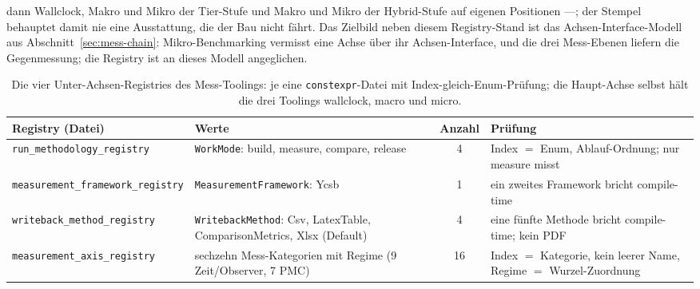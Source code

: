 \begin{nurlang}
dann Wallclock, Makro und Mikro der Tier-Stufe und Makro und Mikro der Hybrid-Stufe auf eigenen
Positionen ---; der Stempel behauptet damit nie eine Ausstattung, die der Bau nicht fährt. Das Zielbild
neben diesem Registry-Stand ist das Achsen-Interface-Modell aus Abschnitt~\ref{sec:mess-chain}:
Mikro-Benchmarking vermisst eine Achse über ihr Achsen-Interface, und die drei Mess-Ebenen liefern die
Gegenmessung; die Registry ist an dieses Modell angeglichen.
\begin{table}[htbp]\centering\footnotesize
\begin{tabular}{@{}p{3.0cm}p{4.6cm}cp{4.0cm}@{}}
\toprule
Registry (Datei) & Werte & Anzahl & Prüfung \\
\midrule
\texttt{run\_\allowbreak{}methodology\_\allowbreak{}registry} & \texttt{WorkMode}: build, measure, compare, release & 4 & Index $=$ Enum, Ablauf-Ordnung; nur measure misst \\
\texttt{measurement\_\allowbreak{}framework\_\allowbreak{}registry} & \texttt{MeasurementFramework}: Ycsb & 1 & ein zweites Framework bricht compile-time \\
\texttt{writeback\_\allowbreak{}method\_\allowbreak{}registry} & \texttt{WritebackMethod}: Csv, LatexTable, ComparisonMetrics, Xlsx (Default) & 4 & eine fünfte Methode bricht compile-time; kein PDF \\
\texttt{measurement\_\allowbreak{}axis\_\allowbreak{}registry} & sechzehn Mess-Kategorien mit Regime (9 Zeit/Observer, 7 PMC) & 16 & Index $=$ Kategorie, kein leerer Name, Regime $=$ Wurzel-Zuordnung \\
\bottomrule
\end{tabular}
\caption{Die vier Unter-Achsen-Registries des Mess-Toolings: je eine \texttt{constexpr}-Datei mit
Index-gleich-Enum-Prüfung; die Haupt-Achse selbst hält die drei Toolings wallclock, macro und
micro.}\label{tab:mess-registries}
\end{table}
\end{nurlang}

